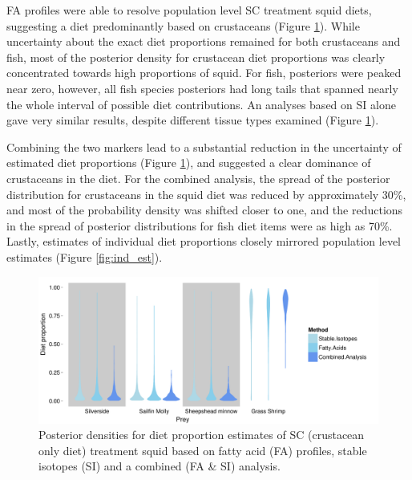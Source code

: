 \documentclass[fleqn,10pt]{wlpeerj}
\begin{document}
FA profiles were able to resolve population level SC treatment squid diets,
suggesting a diet predominantly based on crustaceans
(Figure \ref{fig:pop_comp}). While uncertainty about the exact diet
proportions remained for both crustaceans and fish, most of the
posterior density for crustacean diet proportions was clearly
concentrated towards high
proportions of squid. For fish, posteriors were peaked near zero,
however, all fish species posteriors had long tails that spanned
nearly the whole interval of possible diet contributions. An analyses
based on SI alone gave very similar results, despite different tissue
types examined (Figure \ref{fig:pop_comp}). 

Combining the two markers lead to a substantial reduction in the
uncertainty of estimated diet proportions (Figure \ref{fig:pop_comp}),
and suggested a clear dominance of crustaceans in the diet. For the
combined analysis, the spread of the posterior distribution for crustaceans in the
squid diet was reduced by approximately 30\%, and most of the
probability density was shifted closer to one, and the reductions in
the spread of posterior distributions for fish diet items were as high
as 70\%. Lastly, estimates of individual diet proportions closely
mirrored population level estimates (Figure \ref{fig:ind_est}).

\begin{figure}
  \begin{center}
    \includegraphics[width=1\textwidth]{figures/Comp_plot_violin.pdf}
    \caption{Posterior densities for diet proportion estimates of SC (crustacean only diet)
      treatment squid based on fatty acid (FA) profiles, stable isotopes (SI) and a combined (FA \& SI) analysis.}
    \label{fig:pop_comp}
  \end{center}
\end{figure}
\end{document}

